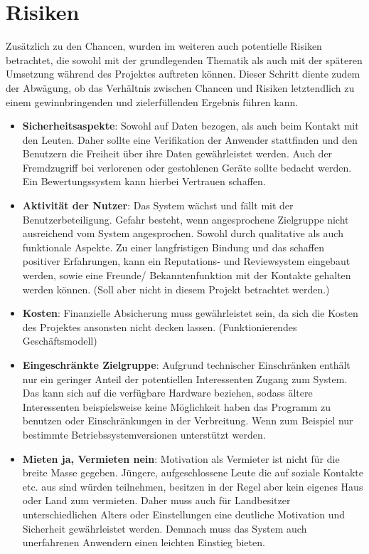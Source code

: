 
\section{Risiken}
Zusätzlich zu den Chancen, wurden im weiteren auch potentielle Risiken betrachtet, die sowohl mit der grundlegenden Thematik als auch mit der späteren Umsetzung während des Projektes auftreten können.
Dieser Schritt diente zudem der Abwägung, ob das Verhältnis zwischen Chancen und Risiken letztendlich zu einem gewinnbringenden und zielerfüllenden Ergebnis führen kann.\\

\begin{itemize}
   \item \textbf{Sicherheitsaspekte}: Sowohl auf Daten bezogen, als auch beim Kontakt mit den Leuten. Daher sollte eine Verifikation der Anwender stattfinden und den Benutzern die Freiheit über ihre Daten gewährleistet werden. Auch der Fremdzugriff bei verlorenen oder gestohlenen Geräte sollte bedacht werden. Ein Bewertungssystem kann hierbei Vertrauen schaffen.

   \item \textbf{Aktivität der Nutzer}: Das System wächst und fällt mit der Benutzerbeteiligung. Gefahr besteht, wenn angesprochene Zielgruppe nicht ausreichend vom System angesprochen. Sowohl durch qualitative als auch funktionale Aspekte. Zu einer langfristigen Bindung und das schaffen positiver Erfahrungen, kann ein Reputations- und Reviewsystem eingebaut werden, sowie eine Freunde/ Bekanntenfunktion mit der Kontakte gehalten werden können. (Soll aber nicht in diesem Projekt betrachtet werden.)

   \item \textbf{Kosten}: Finanzielle Absicherung muss gewährleistet sein, da sich die Kosten des Projektes ansonsten nicht decken lassen. 
   (Funktionierendes Geschäftsmodell)

   \item \textbf{Eingeschränkte Zielgruppe}:
   Aufgrund technischer Einschränken enthält nur ein geringer Anteil der potentiellen Interessenten Zugang zum System. Das kann sich auf die verfügbare Hardware beziehen, sodass ältere Interessenten beispielsweise keine Möglichkeit haben das Programm zu benutzen oder Einschränkungen in der Verbreitung. Wenn zum Beispiel nur bestimmte Betriebssystemversionen unterstützt werden.
     
   \item
   \textbf{Mieten ja, Vermieten nein}: Motivation als Vermieter ist nicht für die breite Masse gegeben. Jüngere, aufgeschlossene Leute die auf soziale Kontakte etc. aus sind würden teilnehmen, besitzen in der Regel aber kein eigenes Haus oder Land zum vermieten. Daher muss auch für Landbesitzer unterschiedlichen Alters oder Einstellungen eine deutliche Motivation und Sicherheit gewährleistet werden. Demnach muss das System auch unerfahrenen Anwendern einen leichten Einstieg bieten.


\end{itemize}
